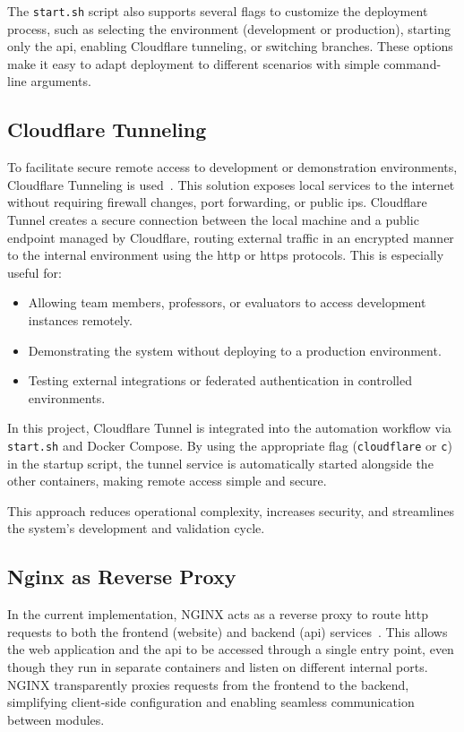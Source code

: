 The \texttt{start.sh} script also supports several flags to customize the deployment process, such as selecting the environment (development or production), starting only the \ac{api}, enabling Cloudflare tunneling, or switching branches. These options make it easy to adapt deployment to different scenarios with simple command-line arguments.

\subsection{Cloudflare Tunneling} \label{subsec:cloudflare_tunneling}

To facilitate secure remote access to development or demonstration environments, Cloudflare Tunneling is used~\cite{cloudflare-tunnel-docs}. This solution exposes local services to the internet without requiring firewall changes, port forwarding, or public \ac{ip}s. Cloudflare Tunnel creates a secure connection between the local machine and a public endpoint managed by Cloudflare, routing external traffic in an encrypted manner to the internal environment using the \ac{http} or \ac{https} protocols. This is especially useful for:

\begin{itemize}
    \item Allowing team members, professors, or evaluators to access development instances remotely.
    \item Demonstrating the system without deploying to a production environment.
    \item Testing external integrations or federated authentication in controlled environments.
\end{itemize}

In this project, Cloudflare Tunnel is integrated into the automation workflow via \texttt{start.sh} and Docker Compose. By using the appropriate flag (\texttt{cloudflare} or \texttt{c}) in the startup script, the tunnel service is automatically started alongside the other containers, making remote access simple and secure.

This approach reduces operational complexity, increases security, and streamlines the system's development and validation cycle.

\subsection{Nginx as Reverse Proxy} \label{subsec:nginx_reverse_proxy}

In the current implementation, NGINX acts as a reverse proxy to route \ac{http} requests to both the frontend (website) and backend (\ac{api}) services~\cite{nginx-docs}. This allows the web application and the \ac{api} to be accessed through a single entry point, even though they run in separate containers and listen on different internal ports. NGINX transparently proxies requests from the frontend to the backend, simplifying client-side configuration and enabling seamless communication between modules.

